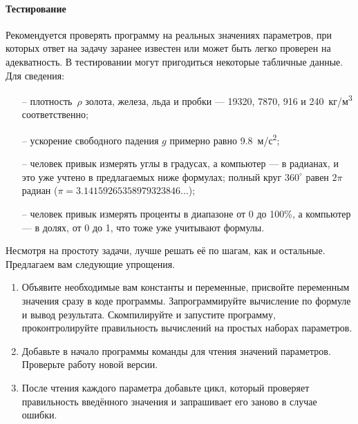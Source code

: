 \paragraph{Тестирование}
Рекомендуется проверять программу на реальных значениях параметров, при
которых ответ на задачу заранее известен или может быть легко проверен на
адекватность. В тестировании могут пригодиться некоторые табличные данные.
Для сведения:
%
\begin{itemize}
%
\item[--] плотность~$\rho$ золота, железа, льда и пробки ---
19320, 7870, 916 и 240~кг/м\textsuperscript{3} соответственно;
%
\item[--] ускорение свободного падения $g$ примерно равно 
9.8~м/с\textsuperscript{2};
%
\item[--] человек привык измерять углы в градусах, а компьютер ---
в радианах, и это уже учтено в предлагаемых ниже формулах;
полный круг $360^{\circ}$ равен $2\pi$ радиан ($\pi = 3.14159265358979323846\dots$);
%
\item[--] человек привык измерять проценты в диапазоне от 0 до 100\%,
а компьютер --- в долях, от 0 до 1, что тоже уже учитывают формулы.
\end{itemize}


\zzsectionPLAN

Несмотря на простоту задачи, лучше решать её по шагам, как и остальные.
Предлагаем вам следующие упрощения.

\begin{enumerate}
\item Объявите необходимые вам константы и переменные, присвойте переменным
значения сразу в коде программы. Запрограммируйте вычисление по формуле и
вывод результата. Скомпилируйте и запустите программу, проконтролируйте
правильность вычислений на простых наборах параметров.
%
\item Добавьте в начало программы команды для чтения значений параметров.
Проверьте работу новой версии.
%
\item После чтения каждого параметра добавьте цикл, который проверяет
правильность введённого значения и запрашивает его заново в случае ошибки.
\end{enumerate}


\zzsectionVARIATIONS


